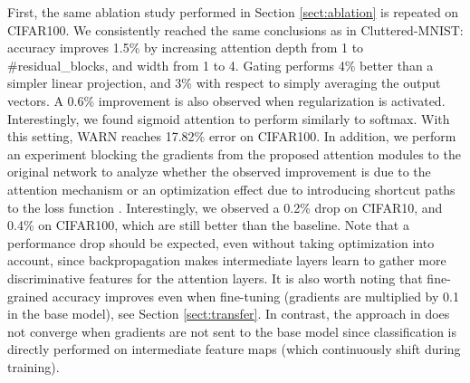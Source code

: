\documentclass[runningheads]{llncs}
\begin{document}
First, the same ablation study performed in Section \ref{sect:ablation} is repeated on CIFAR100. We consistently reached the same conclusions as in Cluttered-MNIST: accuracy improves 1.5\% by increasing attention depth from 1 to \#residual\_blocks, and width from 1 to 4. Gating performs 4\% better than a simpler linear projection, and 3\% with respect to simply averaging the output vectors. A 0.6\% improvement is also observed when regularization is activated. Interestingly, we found sigmoid attention to perform similarly to softmax. With this setting, WARN reaches 17.82\% error on CIFAR100. In addition, we perform an experiment blocking the gradients from the proposed attention modules to the original network to analyze whether the observed improvement is due to the attention mechanism or an optimization effect due to introducing shortcut paths to the loss function \cite{lee2015deeply}. Interestingly, we observed a 0.2\% drop on CIFAR10, and 0.4\% on CIFAR100, which are still better than the baseline. Note that a performance drop should be expected, even without taking optimization into account, since backpropagation makes intermediate layers learn to gather more discriminative features for the attention layers. It is also worth noting that fine-grained accuracy improves even when fine-tuning (gradients are multiplied by 0.1 in the base model), see Section \ref{sect:transfer}. In contrast, the approach in \cite{jetley2018learn} does not converge when gradients are not sent to the base model since classification is directly performed on intermediate feature maps (which continuously shift during training).
\end{document}
